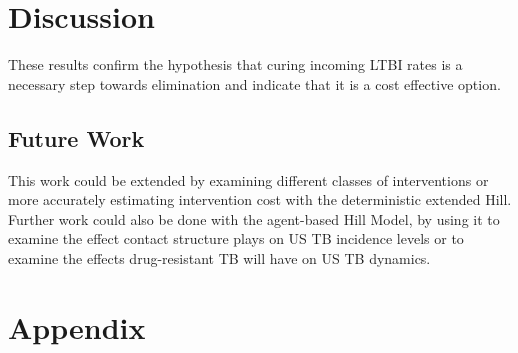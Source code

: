 \documentclass{amsart}
\begin{document}
\section{Discussion}
These results confirm the hypothesis that curing incoming LTBI rates is a
necessary step towards elimination and indicate that it is a cost effective
option. 
\subsection{Future Work}
This work could be extended by examining different classes of interventions or
more accurately estimating intervention cost with the deterministic extended
Hill. Further work could also be done with the agent-based Hill Model, by using
it to examine the effect contact structure plays on US TB incidence levels or to
examine the effects drug-resistant TB will have on US TB dynamics. 
\section{Appendix}
\end{document}
